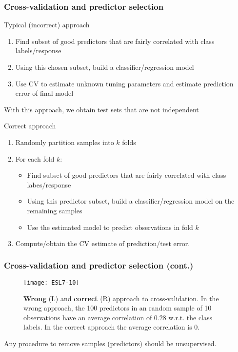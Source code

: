 \documentclass[smaller]{beamer}
\newcommand{\?}{\stackrel{?}{=}}
\newcommand{\rd}{\color{red}}
\newcommand{\gr}{\color{green!40!black}}
\begin{document}
\begin{frame}
  \frametitle{Cross-validation and predictor selection}
  \begin{minipage}[t]{.47\linewidth}
    \begin{alertblock}{Typical (incorrect) approach}\pause
      \begin{enumerate}[<+->]
      \item Find subset of good predictors that are fairly correlated with class labels/response
      \item Using this chosen subset, build a  classifier/regression model
      \item Use CV to estimate unknown tuning parameters and estimate prediction error of final model
      \end{enumerate}
      With this approach, we obtain test sets that are not independent
    \end{alertblock}
  \end{minipage}\hfill\pause
  \begin{minipage}[t]{.49\linewidth}
    \begin{exampleblock}{Correct approach}\pause
      \begin{enumerate}[<+->]
      \item Randomly partition samples into $k$ folds
      \item For each fold $k$:\pause
        \begin{itemize}[<+->]
        \item Find subset of good predictors that are fairly correlated with class labes/response
        \item Using this predictor subset, build a classifier/regression model on the remaining samples
        \item Use the estimated model to predict observations in fold $k$
        \end{itemize}
      \item Compute/obtain the CV estimate of prediction/test error.
      \end{enumerate}
    \end{exampleblock}    
  \end{minipage}
\end{frame}

\begin{frame}
  \frametitle{Cross-validation and predictor selection (cont.)}
  \pause

  \begin{figure}[h!]
    \centering
    \texttt{[image: ESL7-10]}
    \caption{{\rd\bf Wrong} (L) and {\gr\bf correct} (R) approach to cross-validation.
      In the wrong approach, the 100 predictors in an random sample of 10 observations have an average correlation of 0.28 w.r.t. the class labels.
      In the correct approach the average correlation is 0.}
    \label{fig:approach}
  \end{figure}
  {\rd Any procedure to remove samples (predictors) should be unsupervised.} %
\end{frame}
\end{document}
